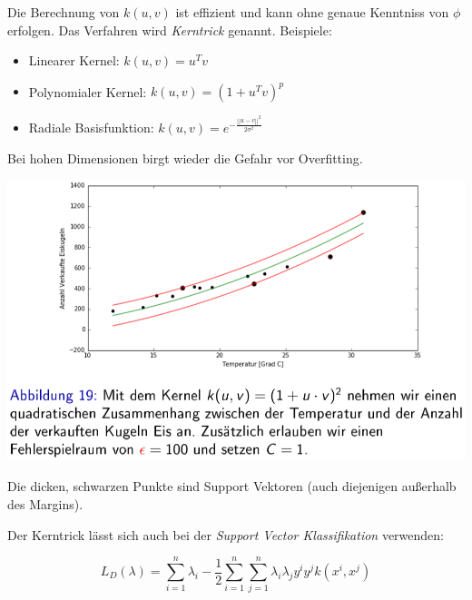 \documentclass{report}
\begin{document}
Die Berechnung von $k(u, v)$ ist effizient und kann ohne genaue Kenntniss von $\phi$ erfolgen.
Das Verfahren wird \textit{Kerntrick} genannt. Beispiele:\\
\vspace*{-1.5em}
\begin{itemize}
  \item Linearer Kernel: $k(u, v) = u^Tv$
  \item Polynomialer Kernel: $k(u, v) = (1 + u^Tv)^p$
  \item Radiale Basisfunktion: $k(u, v) = e^{-\frac{||u-v||^2}{2\sigma^2}}$
\end{itemize}

Bei hohen Dimensionen birgt wieder die Gefahr vor Overfitting.

\begin{center}
  \includegraphics[scale=.295]{ml06_19}
\end{center}

Die dicken, schwarzen Punkte sind Support Vektoren (auch diejenigen außerhalb des Margins).

Der Kerntrick lässt sich auch bei der \textit{Support Vector Klassifikation} verwenden:

$$L_D(\lambda) = \sum_{i=1}^n\lambda_i - \frac{1}{2}\sum_{i=1}^n\sum_{j=1}^n\lambda_i\lambda_jy^iy^jk(x^i, x^j)$$
\end{document}
